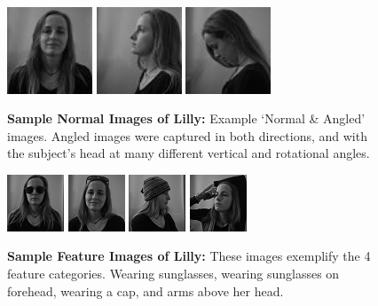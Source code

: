 \documentclass[conference,11pt]{IEEEtran}
\begin{document}
\begin{figure}[ht]
    \centering
    \includegraphics[width=1in]{pictures/Datasets/64pixStraightSquareBW.jpg}
    \includegraphics[width=1in]{pictures/Datasets/64pix45degSquareBW.jpg}
    \includegraphics[width=1in]{pictures/Datasets/64pix90degSquareBW.jpg}
    \caption{\textbf{Sample Normal Images of Lilly:} Example `Normal \& Angled' images. Angled images were captured in both directions, and with the subject's head at many different vertical and rotational angles.}
\end{figure}

\begin{figure}[ht]
    \centering
    \includegraphics[width=.82in]{pictures/Datasets/glassesStraight.jpg}
    \includegraphics[width=.82in]{pictures/Datasets/GlassesForheadStraight.jpg}
    \includegraphics[width=.82in]{pictures/Datasets/Hat90deg.jpg}
    \includegraphics[width=.82in]{pictures/Datasets/armsUp.jpg}
    \caption{\textbf{Sample Feature Images of Lilly:} These images exemplify the 4 feature categories.  Wearing sunglasses, wearing sunglasses on forehead, wearing a cap, and arms above her head.}
\end{figure}
\end{document}
